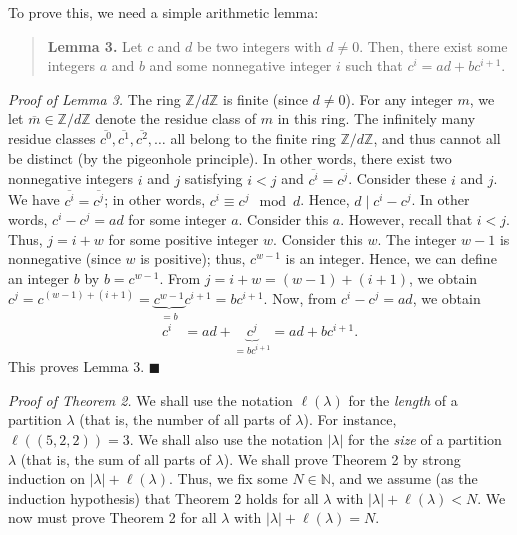 \documentclass[10pt,a4paper]{article}
\begin{document}
To prove this, we need a simple arithmetic lemma:



\begin{quote}



\textbf{Lemma 3.} Let $c$ and $d$ be two integers with $d\neq0$. Then, there exist
some integers $a$ and $b$ and some nonnegative integer $i$ such that
$c^i =ad+bc^{i+1}$.



\end{quote}



\emph{Proof of Lemma 3.} The ring $\mathbb{Z}/d\mathbb{Z}$ is finite (since
$d\neq0$). For any integer $m$, we let $\overline{m}\in\mathbb{Z}/d\mathbb{Z}$
denote the residue class of $m$ in this ring. The infinitely many residue
classes $\overline{c^{0}},\overline{c^{1}},\overline{c^{2}},\ldots$ all belong
to the finite ring $\mathbb{Z}/d\mathbb{Z}$, and thus cannot all be distinct
(by the pigeonhole principle). In other words, there exist two nonnegative
integers $i$ and $j$ satisfying $i<j$ and $\overline{c^i }=\overline{c^j }$.
Consider these $i$ and $j$. We have $\overline{c^i }=\overline{c^j }$; in
other words, $c^i \equiv c^j \mod d$. Hence, $d\mid c^i 
-c^j $. In other words, $c^i -c^j =ad$ for some integer $a$. Consider this
$a$. However, recall that $i<j$. Thus, $j=i+w$ for some positive integer $w$.
Consider this $w$. The integer $w-1$ is nonnegative (since $w$ is positive);
thus, $c^{w-1}$ is an integer. Hence, we can define an integer $b$ by
$b=c^{w-1}$. From $j = i+w = \left(w-1\right) + \left(i+1\right)$, we obtain $c^j = c^{\left(w-1\right) + \left(i+1\right)} = \underbrace{c^{w-1}}_{= b} c^{i+1} = bc^{i+1}$.
Now, from $c^i -c^j =ad$, we obtain
\begin{align*}
c^i   & =ad+\underbrace{c^j }_{= bc^{i+1}} =ad+bc^{i+1}.
\end{align*}
This proves Lemma 3. $\blacksquare$




\emph{Proof of Theorem 2.} We shall use the notation $\ell\left(  \lambda\right)  $
for the \emph{length} of a partition $\lambda$ (that is, the number of all parts of
$\lambda$). For instance, $\ell\left(  \left(  5,2,2\right)  \right)  =3$. We
shall also use the notation $\left\vert \lambda\right\vert $ for the \emph{size} of
a partition $\lambda$ (that is, the sum of all parts of $\lambda$). We shall
prove Theorem 2 by strong induction on $\left\vert \lambda\right\vert
+\ell\left(  \lambda\right)  $. Thus, we fix some $N\in\mathbb{N}$, and we
assume (as the induction hypothesis) that Theorem 2 holds for all $\lambda$
with $\left\vert \lambda\right\vert +\ell\left(  \lambda\right)  <N$. We now
must prove Theorem 2 for all $\lambda$ with $\left\vert \lambda\right\vert
+\ell\left(  \lambda\right)  =N$.
\end{document}
